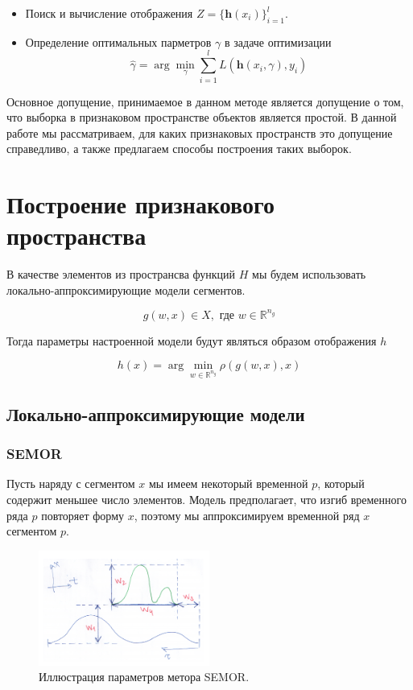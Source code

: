 \documentclass[12pt,fleqn,unicode]{article}
\newcommand{\bh}{\mathbf{h}}
\newcommand{\R}{\mathbb{R}}
\begin{document}
\begin{itemize}
    \item Поиск и вычисление отображения $Z = \{\bh(x_i)\}_{i=1}^l$.
    \item Определение оптимальных парметров $\gamma$ в задаче оптимизации
    $$
    \hat{\gamma} = \arg\min_{\gamma} \sum_{i=1}^{l}L(\bh(x_i, \gamma), y_i)
    $$
\end{itemize}

Основное допущение, принимаемое в данном методе является допущение о том, что
выборка в признаковом пространстве объектов является простой. В данной работе
мы рассматриваем, для каких признаковых пространств это допущение справедливо,
а также предлагаем способы построения таких выборок.

\section{Построение признакового пространства}

В качестве элементов из пространсва функций $H$ мы будем использовать
локально-аппроксимирующие модели сегментов.

$$
g(w, x) \in X, \text{ где }w \in \R^{n_g}
$$

Тогда параметры настроенной модели будут являться образом отображения $h$

$$
h(x) = \arg\min_{w \in \R^{n_g}} \rho(g(w, x), x)
$$

\subsection{Локально-аппроксимирующие модели}

\subsubsection{SEMOR}

Пусть наряду с сегментом $x$ мы имеем некоторый временной $p$, который содержит
меньшее число элементов. Модель предполагает, что изгиб временного ряда $p$ повторяет
форму $x$, поэтому мы аппроксимируем временной ряд $x$ сегментом $p$.

\begin{figure}[ht]
    \caption{Иллюстрация параметров метора SEMOR.}
    \centering
      \includegraphics[width=0.5\textwidth]{../pics/semor_illustration.png}
\end{figure}
\end{document}
